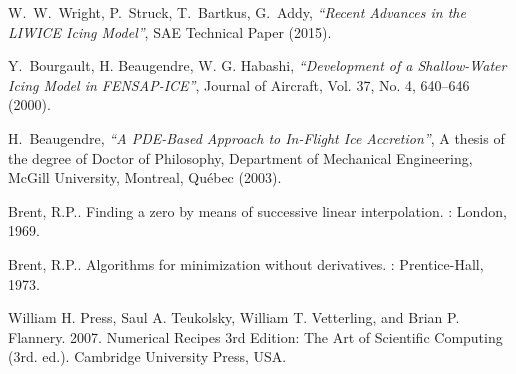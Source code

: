 \documentclass[
11pt,%
tightenlines,%
twoside,%
onecolumn,%
nofloats,%
nobibnotes,%
nofootinbib,%
superscriptaddress,%
noshowpacs,%
centertags]%
{revtex4}
\begin{document}
\begin{thebibliography}{99}

W.~W.~Wright, P.~Struck, T.~Bartkus, G.~Addy, {\it ``Recent Advances in the LIWICE Icing Model''}, SAE Technical Paper (2015).

Y.~Bourgault, H. Beaugendre, W. G. Habashi, {\it ``Development of a Shallow-Water Icing Model in FENSAP-ICE''}, Journal of Aircraft, Vol. 37, No. 4, 640--646 (2000).

H.~Beaugendre, {\it ``A PDE-Based Approach to In-Flight Ice Accretion''}, A thesis of the degree of Doctor of Philosophy, Department of Mechanical Engineering, McGill University, Montreal, Qu\'ebec (2003).

Brent, R.P.. Finding a zero by means of successive linear interpolation. : London, 1969.

Brent, R.P.. Algorithms for minimization without derivatives. : Prentice-Hall, 1973.

William H. Press, Saul A. Teukolsky, William T. Vetterling, and Brian P. Flannery. 2007. Numerical Recipes 3rd Edition: The Art of Scientific Computing (3rd. ed.). Cambridge University Press, USA.


\end{thebibliography}
\end{document}
